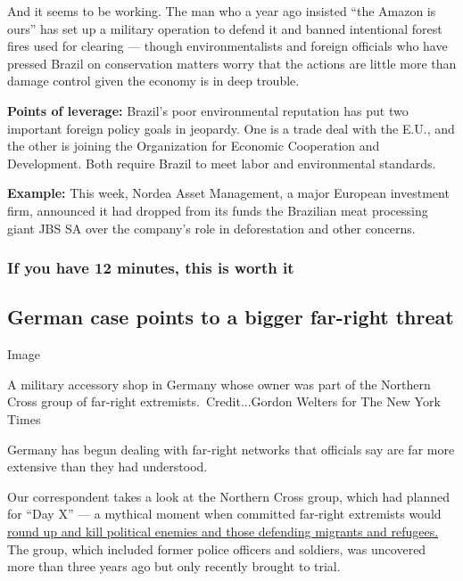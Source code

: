 And it seems to be working. The man who a year ago insisted ``the Amazon
is ours'' has set up a military operation to defend it and banned
intentional forest fires used for clearing --- though environmentalists
and foreign officials who have pressed Brazil on conservation matters
worry that the actions are little more than damage control given the
economy is in deep trouble.

\textbf{Points of leverage:} Brazil's poor environmental reputation has
put two important foreign policy goals in jeopardy. One is a trade deal
with the E.U., and the other is joining the Organization for Economic
Cooperation and Development. Both require Brazil to meet labor and
environmental standards.

\textbf{Example:} This week, Nordea Asset Management, a major European
investment firm, announced it had dropped from its funds the Brazilian
meat processing giant JBS SA over the company's role in deforestation
and other concerns.

\hypertarget{if-you-have-12-minutes-this-is-worth-it}{%
\subsubsection{If you have 12 minutes, this is worth
it}\label{if-you-have-12-minutes-this-is-worth-it}}

\hypertarget{german-case-points-to-a-bigger-far-right-threat}{%
\subsection{German case points to a bigger far-right
threat}\label{german-case-points-to-a-bigger-far-right-threat}}

Image

A military accessory shop in Germany whose owner was part of the
Northern Cross group of far-right extremists.~Credit...Gordon Welters
for The New York Times

Germany has begun dealing with far-right networks that officials say are
far more extensive than they had understood.

Our correspondent takes a look at the Northern Cross group, which had
planned for ``Day X'' --- a mythical moment when committed far-right
extremists would
\href{https://www.nytimes.com/2020/08/01/world/europe/germany-nazi-infiltration.html}{round
up and kill political enemies and those defending migrants and
refugees.} The group, which included former police officers and
soldiers, was uncovered more than three years ago but only recently
brought to trial.

